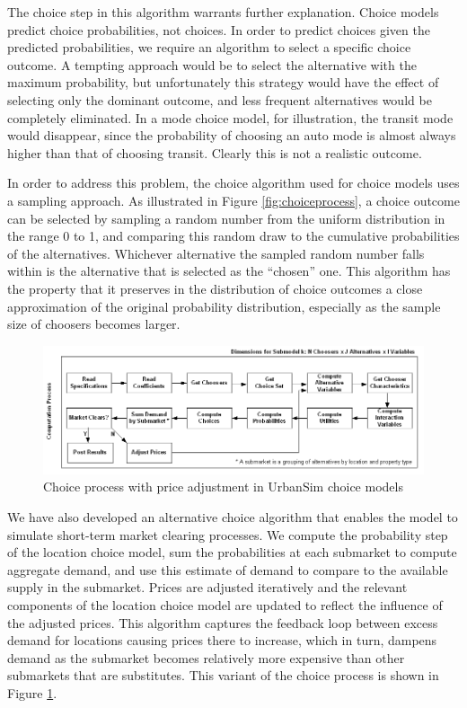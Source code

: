 The choice step in this algorithm warrants further explanation. Choice models predict choice probabilities, not choices. In order to predict choices given the predicted probabilities, we require an algorithm to select a specific choice outcome. A tempting approach would be to select the alternative with the maximum probability, but unfortunately this strategy would have the effect of selecting only the dominant outcome, and less frequent alternatives would be completely eliminated. In a mode choice model, for illustration, the transit mode would disappear, since the probability of choosing an auto mode is almost always higher than that of choosing transit. Clearly this is not a realistic outcome.

In order to address this problem, the choice algorithm used for choice models uses a sampling approach. As illustrated in Figure \ref{fig:choiceprocess}, a choice outcome can be selected by sampling a random number from the uniform distribution in the range 0 to 1, and comparing this random draw to the cumulative probabilities of the alternatives. Whichever alternative the sampled random number falls within is the alternative that is selected as the \enquote{chosen} one. This algorithm has the property that it preserves in the distribution of choice outcomes a close approximation of the original probability distribution, especially as the sample size of choosers becomes larger.

\begin{figure}[htbp]
    \center
    \includegraphics[width=\textwidth]
    {graphics/ChoiceProcessWithPriceAdjustment.png}
    \caption{Choice process with price adjustment in UrbanSim choice models}
    \label{fig:choiceprocesswithprice}
\end{figure}

We have also developed an alternative choice algorithm that enables the model to simulate short-term market clearing processes. We compute the probability step of the location choice model, sum the probabilities at each submarket to compute aggregate demand, and use this estimate of demand to compare to the available supply in the submarket. Prices are adjusted iteratively and the relevant components of the location choice model are updated to reflect the influence of the adjusted prices. This algorithm captures the feedback loop between excess demand for locations causing prices there to increase, which in turn, dampens demand as the submarket becomes relatively more expensive than other submarkets that are substitutes. This variant of the choice process is shown in Figure \ref{fig:choiceprocesswithprice}.

